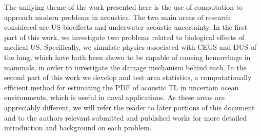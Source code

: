 The unifying theme of the work presented here is the use of
computation to approach modern problems in acoustics. The two main
areas of research considered are \acf{US} bioeffects and underwater
acoustic uncertainty. In the first part of this work, we investigate
two problems related to biological effects of medical
\ac{US}. Specifically, we simulate physics associated with \ac{CEUS}
and \ac{DUS} of the lung, which have both been shown to be capable of
causing hemorrhage in mammals, in order to investigate the damage
mechanism behind each. In the second part of this work we develop and
test area statistics, a computationally efficient method for
estimating the \ac{PDF} of acoustic \ac{TL} in uncertain ocean
environments, which is useful in naval applications. As these areas
are appreciably different, we will refer the reader to later portions
of this document and to the authors relevant submitted and published
works for more detailed introduction and background on each problem.


